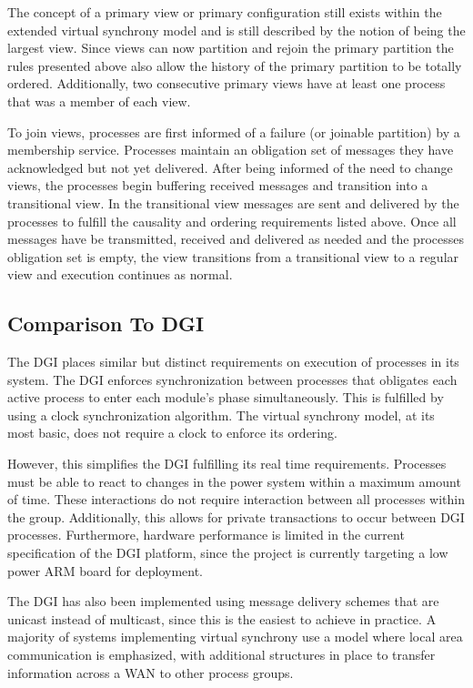 The concept of a primary view or primary configuration still exists within the extended virtual synchrony model and is still described by the notion of being the largest view. Since views can now partition and rejoin the primary partition the rules presented above also allow the history of the primary partition to be totally ordered. Additionally, two consecutive primary views have at least one process that was a member of each view.

To join views, processes are first informed of a failure (or joinable partition) by a membership service. Processes maintain an obligation set of messages they have acknowledged but not yet delivered. After being informed of the need to change views, the processes begin buffering received messages and transition into a transitional view. In the transitional view messages are sent and delivered by the processes to fulfill the causality and ordering requirements listed above. Once all messages have be transmitted, received and delivered as needed and the processes obligation set is empty, the view transitions from a transitional view to a regular view and execution continues as normal.

\subsection{Comparison To DGI}

The DGI places similar but distinct requirements on execution of processes in its system. The DGI enforces synchronization between processes that obligates each active process to enter each module's phase simultaneously. This is fulfilled by using a clock synchronization algorithm. The virtual synchrony model, at its most basic, does not require a clock to enforce its ordering.

However, this simplifies the DGI fulfilling its real time requirements.  Processes must be able to react to changes in the power system within a maximum amount of time. These interactions do not require interaction between all processes within the group. Additionally, this allows for private transactions to occur between DGI processes. Furthermore, hardware performance is limited in the current specification of the DGI platform, since the project is currently targeting a low power ARM board for deployment.

The DGI has also been implemented using message delivery schemes that are unicast instead of multicast, since this is the easiest to achieve in practice. A majority of systems implementing virtual synchrony use a model where local area communication is emphasized, with additional structures in place to transfer information across a WAN to other process groups.

